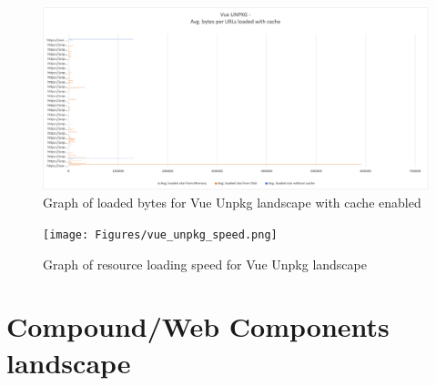 \newpage
\begin{figure}[!h]
	\centering
	\includegraphics[width=1.4\textwidth, angle=90]{Figures/vue_unpkg_bytes_cache.png}
	\caption{Graph of loaded bytes for Vue Unpkg landscape with cache enabled}
	\label{fig:appendix_1_19}
\end{figure}
\newpage
\begin{figure}[!h]
	\centering
	\texttt{[image: Figures/vue\_unpkg\_speed.png]}
	\caption{Graph of resource loading speed for Vue Unpkg landscape}
	\label{fig:appendix_1_20}
\end{figure}
\newpage

\section{Compound/Web Components landscape}

